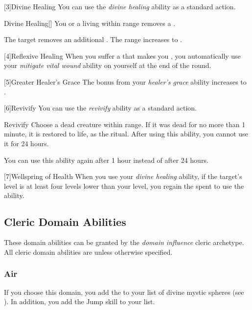         [3]{Divine Healing} You can use the \textit{divine healing} ability as a standard action.
        \begin{apability}{Divine Healing}[]
            You or a living  within \rngmed range removes a .

            \rankline
             The target removes an additional .
             The range increases to \rnglong.
        \end{apability}

        [4]{Reflexive Healing} When you suffer a  that makes you , you automatically use your \textit{mitigate vital wound} ability on yourself at the end of the round.

        [5]{Greater Healer's Grace} The bonus from your \textit{healer's grace} ability increases to .

        [6]{Revivify} You can use the \textit{revivify} ability as a standard action.
        \begin{apability}{Revivify}
            Choose a dead creature within \rngclose range.
            If it was dead for no more than 1 minute, it is restored to life, as the  ritual.
            After using this ability, you cannot use it for 24 hours.

            \rankline
             You can use this ability again after 1 hour instead of after 24 hours.
        \end{apability}

        [7]{Wellspring of Health} When you use your \textit{divine healing} ability,
            if the target's level is at least four levels lower than your level,
            you regain the  spent to use the ability.

    \subsection{Cleric Domain Abilities}\label{Cleric Domain Abilities}
        These domain abilities can be granted by the \textit{domain influence} cleric archetype.
        All cleric domain abilities are  unless otherwise specified.

        \subsubsection{Air}
            If you choose this domain, you add the   to your list of divine mystic spheres (see ).
            In addition, you add the Jump skill to your  list.

